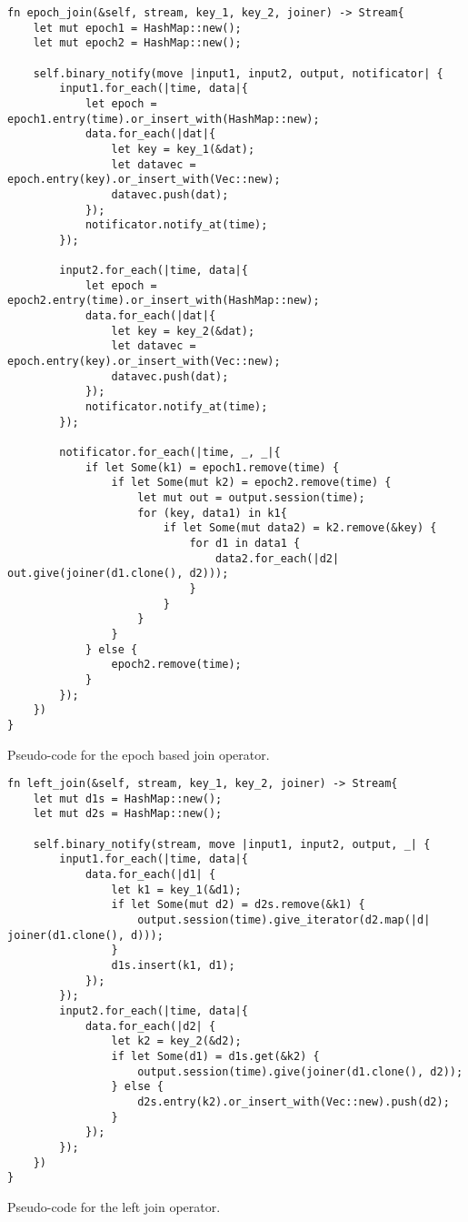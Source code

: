\begin{listing}[H]
\begin{verbatim}
fn epoch_join(&self, stream, key_1, key_2, joiner) -> Stream{
    let mut epoch1 = HashMap::new();
    let mut epoch2 = HashMap::new();
    
    self.binary_notify(move |input1, input2, output, notificator| {
        input1.for_each(|time, data|{
            let epoch = epoch1.entry(time).or_insert_with(HashMap::new);
            data.for_each(|dat|{
                let key = key_1(&dat);
                let datavec = epoch.entry(key).or_insert_with(Vec::new);
                datavec.push(dat);
            });
            notificator.notify_at(time);
        });
        
        input2.for_each(|time, data|{
            let epoch = epoch2.entry(time).or_insert_with(HashMap::new);
            data.for_each(|dat|{
                let key = key_2(&dat);
                let datavec = epoch.entry(key).or_insert_with(Vec::new);
                datavec.push(dat);
            });
            notificator.notify_at(time);
        });
        
        notificator.for_each(|time, _, _|{
            if let Some(k1) = epoch1.remove(time) {
                if let Some(mut k2) = epoch2.remove(time) {
                    let mut out = output.session(time);
                    for (key, data1) in k1{
                        if let Some(mut data2) = k2.remove(&key) {
                            for d1 in data1 {
                                data2.for_each(|d2| out.give(joiner(d1.clone(), d2)));
                            }
                        }
                    }
                }
            } else {
                epoch2.remove(time);
            }
        });
    })
}
\end{verbatim}
  \caption{Pseudo-code for the epoch based join operator.}
  \label{lst:epoch-join}
\end{listing}

\begin{listing}[H]
\begin{verbatim}
fn left_join(&self, stream, key_1, key_2, joiner) -> Stream{
    let mut d1s = HashMap::new();
    let mut d2s = HashMap::new();

    self.binary_notify(stream, move |input1, input2, output, _| {
        input1.for_each(|time, data|{
            data.for_each(|d1| {
                let k1 = key_1(&d1);
                if let Some(mut d2) = d2s.remove(&k1) {
                    output.session(time).give_iterator(d2.map(|d| joiner(d1.clone(), d)));
                }
                d1s.insert(k1, d1);
            });
        });
        input2.for_each(|time, data|{
            data.for_each(|d2| {
                let k2 = key_2(&d2);
                if let Some(d1) = d1s.get(&k2) {
                    output.session(time).give(joiner(d1.clone(), d2));
                } else {
                    d2s.entry(k2).or_insert_with(Vec::new).push(d2);
                }
            });
        });
    })
}
\end{verbatim}
  \caption{Pseudo-code for the left join operator.}
  \label{lst:left-join}
\end{listing}

